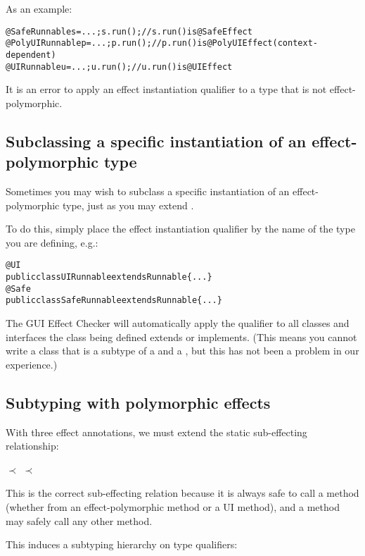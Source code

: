 As an example:

\begin{alltt}
@Safe Runnable s = ...;     s.run();     // s.run() is @SafeEffect
@PolyUI Runnable p = ...;   p.run();     // p.run() is @PolyUIEffect (context-dependent)
@UI Runnable u = ...;       u.run();     // u.run() is @UIEffect
\end{alltt}

It is an error to apply an effect instantiation qualifier to a type that is not effect-polymorphic.

\subsection{Subclassing a specific instantiation of an effect-polymorphic type\label{guieffects-subclassing}}
Sometimes you may wish to subclass a specific instantiation of an effect-polymorphic type, just as
you may extend .

To do this, simply place the effect instantiation qualifier by the name of the type you are
defining, e.g.:

\begin{alltt}
@UI
public class UIRunnable extends Runnable \{...\}
@Safe
public class SafeRunnable extends Runnable \{...\}
\end{alltt}
The GUI Effect Checker will automatically apply the qualifier to all classes and interfaces the class
being defined extends or implements.  (This means you cannot write a class that is a subtype of a
 and a , but this has not been a problem in our experience.)

\subsection{Subtyping with polymorphic effects\label{guieffects-subtyping}}
With three effect annotations, we must extend the static sub-effecting relationship:

\centerline{ $\prec$  $\prec$ }

\noindent
This is the correct sub-effecting relation because it is always safe to
call a 
method (whether from an effect-polymorphic method or a UI method), and a  method
may safely call any other method.

This induces a subtyping hierarchy on type qualifiers:

